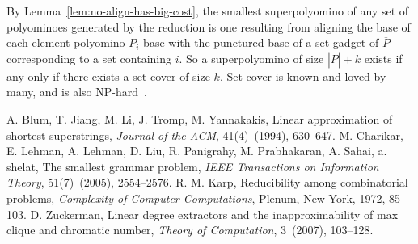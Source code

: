\documentclass{article}
\newenvironment{proof}[1][Proof]{\begin{trivlist}
\item[\hskip \labelsep {\bfseries #1}]}{\end{trivlist}}
\newcommand{\ccNP}{\textrm{\textsc{NP}}}
\begin{document}
\begin{proof}
By Lemma~\ref{lem:no-align-has-big-cost}, the smallest superpolyomino of any set of polyominoes generated by the reduction is one resulting from aligning the base of each element polyomino $P_i$ base with the punctured base of a set gadget of $\overline{P}$ corresponding to a set containing $i$.
So a superpolyomino of size $|\overline{P}| + k$ exists if any only if there exists a set cover of size $k$.
Set cover is known and loved by many, and is also \ccNP-hard~\cite{Karp-1972}. 
\end{proof}



\begin{thebibliography}{4}
A. Blum, T. Jiang, M. Li, J. Tromp, M. Yannakakis,
Linear approximation of shortest superstrings,
\emph{Journal of the ACM},
41(4)~(1994), 630--647.
M. Charikar, E. Lehman, A. Lehman, D. Liu, R. Panigrahy, M. Prabhakaran, A. Sahai, a. shelat,
The smallest grammar problem,
\emph{IEEE Transactions on Information Theory},
51(7)~(2005), 2554--2576.
R. M. Karp, 
Reducibility among combinatorial problems,
\emph{Complexity of Computer Computations},
Plenum, New York, 1972, 85--103.
D. Zuckerman,
Linear degree extractors and the inapproximability of max clique and chromatic number,
\emph{Theory of Computation},
3~(2007), 103--128.
\end{thebibliography}
\end{document}
